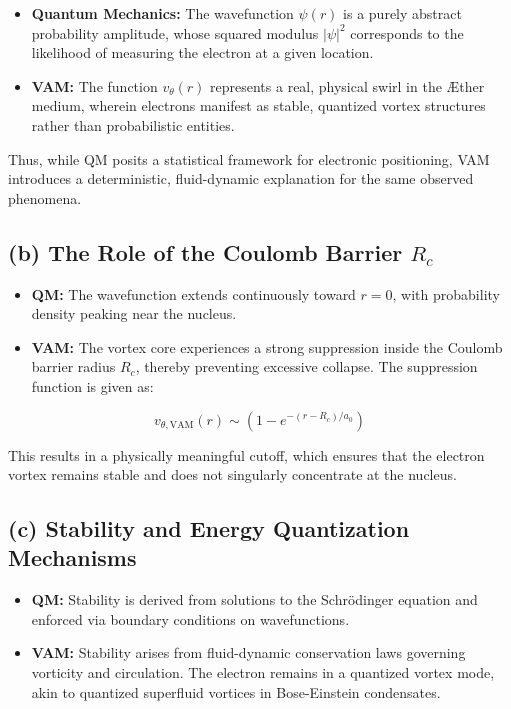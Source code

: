 \documentclass[a4paper,10pt]{article}
\begin{document}
\begin{itemize}
    \item \textbf{Quantum Mechanics:} The wavefunction \(\psi(r)\) is a purely abstract probability amplitude, whose squared modulus \(|\psi|^2\) corresponds to the likelihood of measuring the electron at a given location.
    \item \textbf{VAM:} The function \(v_{\theta}(r)\) represents a real, physical swirl in the Æther medium, wherein electrons manifest as stable, quantized vortex structures rather than probabilistic entities.
\end{itemize}

Thus, while QM posits a statistical framework for electronic positioning, VAM introduces a deterministic, fluid-dynamic explanation for the same observed phenomena.

\subsection*{(b) The Role of the Coulomb Barrier \(R_c\)}

\begin{itemize}
    \item \textbf{QM:} The wavefunction extends continuously toward \(r = 0\), with probability density peaking near the nucleus.
    \item \textbf{VAM:} The vortex core experiences a strong suppression inside the Coulomb barrier radius \(R_c\), thereby preventing excessive collapse. The suppression function is given as:
\end{itemize}

\[
    v_{\theta, \text{VAM}}(r) \sim \left(1 - e^{-(r - R_c)/a_0}\right)
\]

This results in a physically meaningful cutoff, which ensures that the electron vortex remains stable and does not singularly concentrate at the nucleus.

\subsection*{(c) Stability and Energy Quantization Mechanisms}

\begin{itemize}
    \item \textbf{QM:} Stability is derived from solutions to the Schrödinger equation and enforced via boundary conditions on wavefunctions.
    \item \textbf{VAM:} Stability arises from fluid-dynamic conservation laws governing vorticity and circulation. The electron remains in a quantized vortex mode, akin to quantized superfluid vortices in Bose-Einstein condensates.
\end{itemize}
\end{document}
